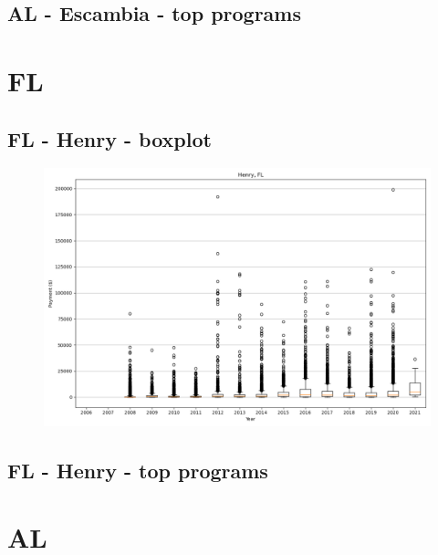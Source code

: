\subsection*{AL - Escambia - top programs}

\newpage
\section*{FL}
\subsection*{FL - Henry - boxplot}
\begin{figure}[h]
\centering
\includegraphics[width=7in]{../output/boxplots/counties/Henry-FL_boxplot.png}
\end{figure}


\subsection*{FL - Henry - top programs}

\newpage
\section*{AL}
